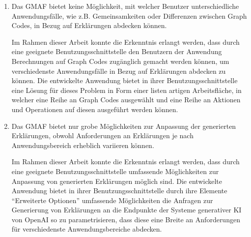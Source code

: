 \begin{enumerate}
  \item Das GMAF bietet keine Möglichkeit, mit welcher Benutzer unterschiedliche Anwendungsfälle, wie z.B. Gemeinsamkeiten oder Differenzen zwischen Graph Codes, in Bezug auf Erklärungen abdecken können.

  Im Rahmen dieser Arbeit konnte die Erkenntnis erlangt werden, dass durch eine geeignete Benutzungsschnittstelle den Benutzern der Anwendung Berechnungen auf Graph Codes zugänglich gemacht werden können, um verschiedenste Anwendungsfälle in Bezug auf Erklärungen abdecken zu können.
  Die entwickelte Anwendung bietet in ihrer Benutzungsschnittstelle eine Lösung für dieses Problem in Form einer listen artigen Arbeitsfläche, in welcher eine Reihe an Graph Codes ausgewählt und eine Reihe an Aktionen und Operationen auf diesen ausgeführt werden können.

  \item Das GMAF bietet nur grobe Möglichkeiten zur Anpassung der generierten Erklärungen, obwohl Anforderungen an Erklärungen je nach Anwendungsbereich erheblich variieren können.

  Im Rahmen dieser Arbeit konnte die Erkenntnis erlangt werden, dass durch eine geeignete Benutzungsschnittstelle umfassende Möglichkeiten zur Anpassung von generierten Erklärungen möglich sind.
  Die entwickelte Anwendung bietet in ihrer Benutzungsschnittstelle durch ihre Elemente \enquote{Erweiterte Optionen} umfassende Möglichkeiten die Anfragen zur Generierung von Erklärungen an die Endpunkte der Systeme generativer KI von OpenAI so zu parametrisieren, dass diese eine Breite an Anforderungen für verschiedenste Anwendungsbereiche abdecken.
\end{enumerate}

